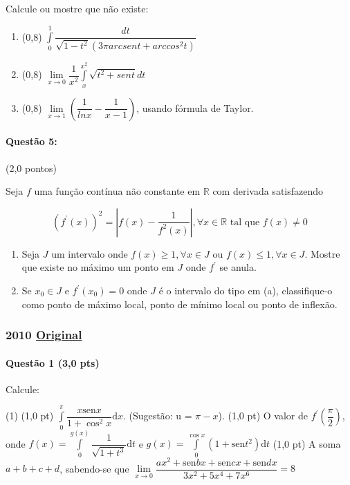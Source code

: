\documentclass[12pt,a4paper]{article}
\newcommand{\sen}{\mathrm{sen}}
\newcommand{\dd}{\mathrm{d}}
\newcommand{\original}[1]{\tiny \href{#1}{Original} \normalsize}
\begin{document}
Calcule ou mostre que não existe:

\begin{enumerate}[label=(\alph*)]
\item (0,8) $\displaystyle\int\limits_0^1 \dfrac{dt}{\sqrt{1-t^2}(3\pi arcsent + arccos^2t)}$
\item (0,8) $\lim\limits_{x\rightarrow0} \dfrac{1}{x^2} \displaystyle\int\limits_x^{x^2} \sqrt{t^2+sent}dt$
\item (0,8) $\lim\limits_{x\rightarrow 1}\left(\dfrac{1}{lnx}-\dfrac{1}{x-1} \right)$, usando fórmula de Taylor.
\end{enumerate}
\paragraph{Questão 5:} (2,0 pontos)

Seja $f$ uma função contínua não constante em $\mathbb{R}$ com derivada satisfazendo 

$$(f^{\prime}(x))^2=\left | f(x)-\dfrac{1}{f^2(x)}\right |,\forall x\in \mathbb{R}\textrm{ tal que } f(x) \neq 0$$

\begin{enumerate}[label=(\alph*)]

\item Seja $J$ um intervalo onde $f(x)\geq 1,\forall x\in J$ ou $f(x) \leq 1, \forall x \in J$. Mostre que existe no máximo um ponto em $J$ onde $f^\prime$ se anula.
\item Se $x_0 \in J$ e $f^\prime(x_0)=0$ onde $J$ é o intervalo do tipo em (a), classifique-o como ponto de máximo local, ponto de mínimo local ou ponto de inflexão.

\end{enumerate}
\newpage
\subsubsection{2010 \original{https://drive.google.com/open?id=1DceZ0TLvSXztDyNk7W2EOf5cObPgKvZR}}

\paragraph{Questão 1 (3,0 pts)} Calcule:
\begin{tasks}(1)
\task (1,0 pt) $\displaystyle\int\limits_0^{\pi} \dfrac{x\sen x}{1+ \cos ^2 x}\dd x$. (Sugestão: u = $\pi - x$).
\task (1,0 pt) O valor de $f^{\prime}\left( \dfrac{\pi}{2} \right)$, onde $f(x) = \displaystyle \int \limits_0^{g(x)}\dfrac{1}{\sqrt{1+t^3}}\dd t$ e $g(x) = \displaystyle\int\limits_{0}^{\cos x}(1+ \sen t^2) \dd t$
\task (1,0 pt) A soma $a+b+c+d$, sabendo-se que $\lim\limits_{x\to 0} \dfrac{ax^2 + \sen bx + \sen cx + \sen dx}{3x^2 + 5x^4 + 7x^6} = 8$
\end{tasks}
\end{document}
